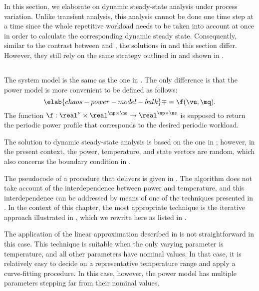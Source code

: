 In this section, we elaborate on dynamic steady-state analysis under process
variation. Unlike transient analysis, this analysis cannot be done one time step
at a time since the whole repetitive workload needs to be taken into account at
once in order to calculate the corresponding dynamic steady state. Consequently,
similar to the contrast between  and
, the solutions in
 and this section differ. However, they still
rely on the same strategy outlined in  and
shown in .

\subsection{\problemtitle}

The system model is the same as the one in . The
only difference is that the power model is more convenient to be defined as
follows:
\begin{equation} \elab{chaos-power-model-bulk}
  \mp = \f(\vu, \mq).
\end{equation}
The function $\f: \real^\nu \times \real^{\np \times \ns} \to \real^{\np \times
\ns}$ is supposed to return the periodic power profile that corresponds to the
desired periodic workload.

The solution to dynamic steady-state analysis is based on the one in
; however, in the present context, the
power, temperature, and state vectors are random, which also concerns the
boundary condition in .

The pseudocode of a procedure that delivers \mq is given in
. The algorithm does not take account of the
interdependence between power and temperature, and this interdependence can be
addressed by means of one of the techniques presented in
. In the context of this chapter, the most
appropriate technique is the iterative approach illustrated in
, which we rewrite here as listed in
.

\begin{remark}
The application of the linear approximation described in
 is not straightforward in this case. This
technique is suitable when the only varying parameter is temperature, and all
other parameters have nominal values. In that case, it is relatively easy to
decide on a representative temperature range and apply a curve-fitting
procedure. In this case, however, the power model has multiple parameters
stepping far from their nominal values.
\end{remark}


